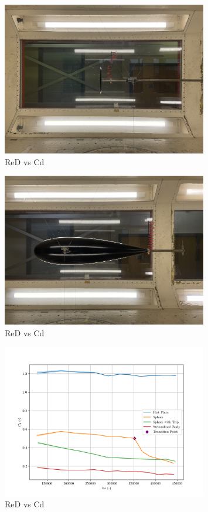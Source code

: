 \documentclass[8pt]{article}
\begin{document}
\begin{figure}[H]
    \centering
    \includegraphics[width=0.8\textwidth]{Images_Videos/Plate_8milibar.JPG}
    \caption{ReD vs Cd}
    \label{fig:figure2}
\end{figure}

\begin{figure}[H]
    \centering
    \includegraphics[width=0.8\textwidth]{Images_Videos/Streamlined_8milibar.JPG}
    \caption{ReD vs Cd}
    \label{fig:figure3}
\end{figure}

\begin{figure}[H]
    \centering
    \includegraphics[width=0.8\textwidth]{Re_vs_Cd.png}
    \caption{ReD vs Cd}
    \label{fig:figure4}
\end{figure}
\end{document}
